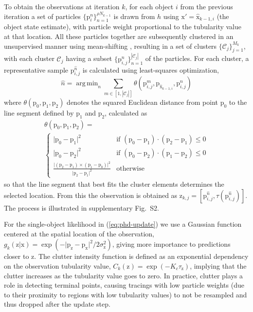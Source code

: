 \documentclass[noinfo,nocrop,final]{bioinfo}
\DeclareMathOperator*{\argmin}{arg\,min}
\begin{document}
To obtain the observations at iteration $k$, for each object $i$ from the previous iteration a set of particles $\{\mathrm{p}_{i}^{n}\}_{n=1}^{\rho N_{k-1}}$ is drawn from $h$ using $\mathrm{x'}=\hat{\mathrm{x}}_{k-1,i}$ (the object state estimate), with particle weight proportional to the tubularity value at that location. All these particles together are subsequently clustered in an unsupervised manner using mean-shifting \citep{cheng1995mean}, resulting in a set of clusters $\lbrace \mathscr{C}_j \rbrace_{j=1}^{M_k}$, with each cluster $\mathscr{C}_j$ having a subset $\lbrace\mathrm{p}_{i,j}^n\rbrace_{n=1}^{|\mathscr{C}_j|}$ of the particles. For each cluster, a representative sample $\mathrm{p}_{i,j}^{\hat{n}}$ is calculated using least-squares optimization,
\begin{equation}
\label{eq:n-measure} %
\hat{n} = \argmin_n \!\!\!\!\!\sum\limits_{m \in \left[ 1, |\mathscr{C}_j| \right]}\!\!\!\!\! \theta(\mathrm{p}_{i,j}^m, \mathrm{p}_{\hat{\mathrm{x}}_{k-1,i}}, \mathrm{p}_{i,j}^n)
\end{equation} %
where $\theta(\mathrm{p}_0, \mathrm{p}_1, \mathrm{p}_2)$ denotes the squared Euclidean distance from point $\mathrm{p}_0$ to the line segment defined by $\mathrm{p}_1$ and $\mathrm{p}_2$, calculated as
\begin{multline}
\label{eq:theta}
\theta(\mathrm{p}_0, \mathrm{p}_1, \mathrm{p}_2) = \\
\begin{cases}
	\vert \mathrm{p}_0 - \mathrm{p}_1 \vert^2 & \textrm{if\ } (\mathrm{p}_0-\mathrm{p}_1) \cdot (\mathrm{p}_2-\mathrm{p}_1) \leq 0 \\
	\vert \mathrm{p}_0 - \mathrm{p}_2 \vert^2 & \textrm{if\ } (\mathrm{p}_0-\mathrm{p}_2) \cdot (\mathrm{p}_1-\mathrm{p}_2) \leq 0 \\
	\frac{\vert(\mathrm{p}_2-\mathrm{p}_1) \times (\mathrm{p}_1-\mathrm{p}_0)\vert^2}{\vert\mathrm{p}_2-\mathrm{p}_1\vert^2} & \textrm{otherwise}
\end{cases}
\end{multline}
so that the line segment that best fits the cluster elements determines the selected location. From this the observation is obtained as $\mathrm{z}_{k,j} = [\mathrm{p}_{i,j}^{\hat{n}}, \tau(\mathrm{p}_{i,j}^{\hat{n}})]$. The process is illustrated in supplementary Fig.~S2.

For the single-object likelihood in (\ref{eq:phd-update}) we use a Gaussian function centered at the spatial location of the observation, $g_k(\mathrm{z}|\mathrm{x})=\exp(-\vert\mathrm{p}_{\mathrm{z}}-\mathrm{p}_{\mathrm{x}}\vert^2/2\sigma_{\mathrm{z}}^2)$, giving more importance to predictions closer to $\mathrm{z}$. The clutter intensity function is defined as an exponential dependency on the observation tubularity value, $C_k(\mathrm{z})=\exp(-K_{c}\tau_{\mathrm{z}})$, implying that the clutter increases as the tubularity value goes to zero. In practice, clutter plays a role in detecting terminal points, causing tracings with low particle weights (due to their proximity to regions with low tubularity values) to not be resampled and thus dropped after the update step.
\end{document}
